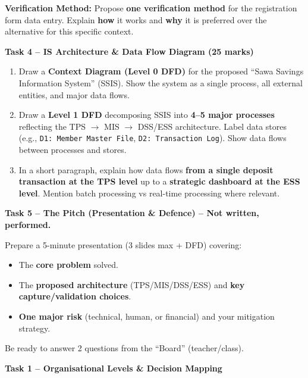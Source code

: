 \documentclass[11pt]{article}
\newcommand{\cle}[1]{{\popxbold\color{popdark}#1}}
\newcounter{popsec}
\newcounter{popsub}
\newcommand{\courssub}[1]{%
  \stepcounter{popsub}%
  \par\vspace{9pt}\noindent{\popxbold\fontsize{11.5}{13}\selectfont\color{popink}{\color{poporange}\thepopsec.\thepopsub}\hspace{6pt}#1}\par\nopagebreak\vspace{4pt}
}
\begin{document}
\medskip
\noindent\textbf{Verification Method:} Propose \textbf{one verification method} for the registration form data entry. Explain \textbf{how} it works and \textbf{why} it is preferred over the alternative for this specific context.

\medskip
\noindent\textbf{Task 4 -- IS Architecture \& Data Flow Diagram (25 marks)}
\begin{enumerate}
    \item Draw a \textbf{Context Diagram (Level 0 DFD)} for the proposed ``Sawa Savings Information System'' (SSIS). Show the system as a single process, all external entities, and major data flows.
    \item Draw a \textbf{Level 1 DFD} decomposing SSIS into \textbf{4--5 major processes} reflecting the TPS $\rightarrow$ MIS $\rightarrow$ DSS/ESS architecture. Label data stores (e.g., \texttt{D1: Member Master File}, \texttt{D2: Transaction Log}). Show data flows between processes and stores.
    \item In a short paragraph, explain how data flows \textbf{from a single deposit transaction at the TPS level} up to a \textbf{strategic dashboard at the ESS level}. Mention \cle{batch processing} vs \cle{real-time processing} where relevant.
\end{enumerate}

\medskip
\noindent\textbf{Task 5 -- The Pitch (Presentation \& Defence) -- Not written, performed.}

Prepare a 5-minute presentation (3 slides max + DFD) covering:
\begin{itemize}
    \item The \textbf{core problem} solved.
    \item The \textbf{proposed architecture} (TPS/MIS/DSS/ESS) and \textbf{key capture/validation choices}.
    \item \textbf{One major risk} (technical, human, or financial) and your mitigation strategy.
\end{itemize}
Be ready to answer 2 questions from the ``Board'' (teacher/class).

\courssub{Model Answer}

\textbf{Task 1 -- Organisational Levels \& Decision Mapping}
\end{document}
